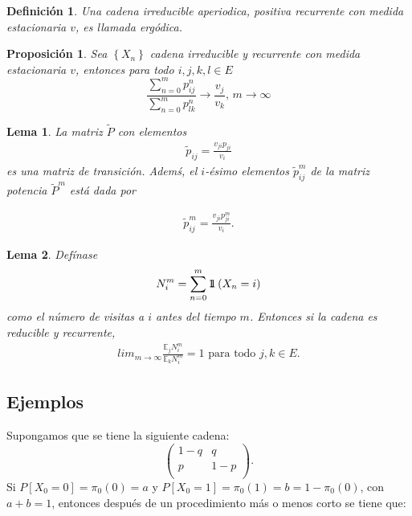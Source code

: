 \documentclass{article}
\newtheorem{Def}{Definición}[section]
\newtheorem{Prop}{Proposición}[section]
\newtheorem{Lema}{Lema}[section]
\newcommand{\esp}{\mathbb{E}}
\newcommand{\indora}{\mbox{$1$\hspace{-0.8ex}$1$}}
\numberwithin{equation}{section}
\begin{document}
\begin{Def}\label{Def.Ergodicidad}
Una cadena irreducible aperiodica, positiva recurrente con medida estacionaria $v$, es llamada {\em erg\'odica}.
\end{Def}

\begin{Prop}\label{Prop.4.4}
Sea $\left\{X_{n}\right\}$ cadena irreducible y recurrente con medida estacionaria $v$, entonces para todo $i,j,k,l\in E$
\begin{equation}
\frac{\sum_{n=0}^{m}p_{ij}^{n}}{\sum_{n=0}^{m}p_{lk}^{n}}\rightarrow\frac{v_{j}}{v_{k}}\textrm{,    }m\rightarrow\infty
\end{equation}
\end{Prop}

\begin{Lema}\label{Lema.4.5}
La matriz $\widetilde{P}$ con elementos 
\begin{eqnarray}
\widetilde{p}_{ij}=\frac{v_{ji}p_{ji}}{v_{i}}
\end{eqnarray}
es una matriz de transici\'on. Adem\'s, el $i$-\'esimo elementos $\widetilde{p}_{ij}^{m}$ de la matriz potencia $\widetilde{P}^{m}$ est\'a dada por 

\begin{eqnarray}
\widetilde{p}_{ij}^{m}=\frac{v_{ji}p_{ji}^{m}}{v_{i}}.
\end{eqnarray}
\end{Lema}

\begin{Lema}
Def\'inase 
\begin{eqnarray}
N_{i}^{m}=\sum_{n=0}^{m}\indora\left(X_{n}=i\right)
\end{eqnarray} 
como el n\'umero de visitas a $i$ antes del tiempo $m$. Entonces si la cadena es reducible y recurrente, 
\begin{eqnarray}
lim_{m\rightarrow\infty}\frac{\esp_{j}N_{i}^{m}}{\esp_{k}N_{i}^{m}}=1\textrm{ para todo }j,k\in E.
\end{eqnarray}
\end{Lema}

\subsection*{Ejemplos}

Supongamos que se tiene la siguiente cadena:
\begin{equation}
\left(\begin{array}{cc}
1-q & q\\
p & 1-p\\
\end{array}
\right).
\end{equation}
Si $P\left[X_{0}=0\right]=\pi_{0}(0)=a$ y $P\left[X_{0}=1\right]=\pi_{0}(1)=b=1-\pi_{0}(0)$, con $a+b=1$, entonces despu\'es de un procedimiento m\'as o menos corto se tiene que:
\end{document}

